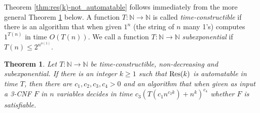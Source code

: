 \documentclass[10pt,a4paper]{article}
\newtheorem{theorem}{Theorem}
\theoremstyle{remark}
\newtheorem*{switching lemma}{Switching Lemma}
\newtheorem*{open problem}{Open Problem}
\theoremstyle{definition}
\begin{document}
Theorem \ref{thm:res(k)-not_automatable} follows immediately from the more general Theorem \ref{thm:res(k)-not_automatable-more_general} below. A function $T: \mathbb{N} \rightarrow \mathbb{N}$ is called \emph{time-constructible} if there is an algorithm that when given $1^n$ (the string of $n$ many 1's) computes $1^{T(n)}$ in time $O(T(n))$. We call a function $T: \mathbb{N} \rightarrow \mathbb{N}$ \emph{subexponential} if $T(n) \leq 2^{n^{o(1)}}$. 

\begin{theorem}
\label{thm:res(k)-not_automatable-more_general}
Let $T: \mathbb{N} \rightarrow \mathbb{N}$ be time-constructible, non-decreasing and subexponential. 
If there is an integer $k \geq 1$ such that $\textnormal{Res}(k)$ is automatable in time $T$, then there are $c_1, c_2, c_3, c_4 > 0$ and an algorithm that when given as input a 3-CNF $F$ in $n$ variables decides in time $c_3 (T(c_1 n^{c_2 k}) + n^{k})^{c_4}$ whether $F$ is satisfiable.
\end{theorem}
\end{document}
